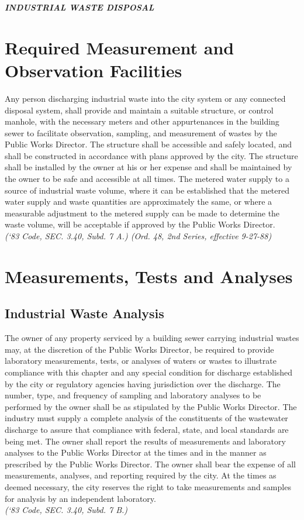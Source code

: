 \begin{center}
\emph{\textbf{\LARGE{INDUSTRIAL WASTE DISPOSAL}}}
\end{center}

\setcounter{section}{34}
\section{Required Measurement and Observation Facilities}
Any person discharging industrial waste into the city system or any connected disposal system, shall provide and maintain a suitable structure, or control manhole, with the necessary meters and other appurtenances in the building sewer to facilitate observation, sampling, and measurement of wastes by the Public Works Director. The structure shall be accessible and safely located, and shall be constructed in accordance with plans approved by the city. The structure shall be installed by the owner at his or her expense and shall be maintained by the owner to be safe and accessible at all times. The metered water supply to a source of industrial waste volume, where it can be established that the metered water supply and waste quantities are approximately the same, or where a measurable adjustment to the metered supply can be made to determine the waste volume, will be acceptable if approved by the Public Works Director.\\
\emph{(‘83 Code, SEC. 3.40, Subd. 7 A.) (Ord. 48, 2nd Series, effective 9-27-88)}
\section{Measurements, Tests and Analyses}
\subsection{Industrial Waste Analysis}
The owner of any property serviced by a building sewer carrying industrial wastes may, at the discretion of the Public Works Director, be required to provide laboratory measurements, tests, or analyses of waters or wastes to illustrate compliance with this chapter and any special condition for discharge established by the city or regulatory agencies having jurisdiction over the discharge.  The number, type, and frequency of sampling and laboratory analyses to be performed by the owner shall be as stipulated by the Public Works Director.  The industry must supply a complete analysis of the constituents of the wastewater discharge to assure that compliance with federal, state, and local standards are being met.  The owner shall report the results of measurements and laboratory analyses to the Public Works Director at the times and in the manner as prescribed by the Public Works Director.  The owner shall bear the expense of all measurements, analyses, and reporting required by the city.  At the times as deemed necessary, the city reserves the right to take measurements and samples for analysis by an independent laboratory.\\
\emph{(‘83 Code, SEC. 3.40, Subd. 7 B.)}
